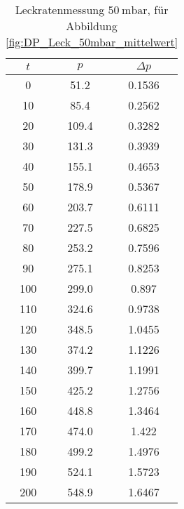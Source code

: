 \begin{table}[H]
    \centering
    \caption{Leckratenmessung $\SI{50}{\milli\bar}$, für Abbildung \ref{fig:DP_Leck_50mbar_mittelwert}}
    \label{tab:}
    \begin{tabular}{c c c}
        \toprule
        {$t$} & {$p$} & {$\Delta p$} \\
        \midrule
        0 & 51.2 & 0.1536  \\
        10 & 85.4 & 0.2562 \\
        20 & 109.4 & 0.3282\\
        30 & 131.3 & 0.3939\\
        40 & 155.1 & 0.4653\\
        50 & 178.9 & 0.5367\\
        60 & 203.7 & 0.6111\\
        70 & 227.5 & 0.6825\\
        80 & 253.2 & 0.7596\\
        90 & 275.1 & 0.8253\\
        100 & 299.0 & 0.897\\
        110 & 324.6 & 0.9738\\
        120 & 348.5 & 1.0455\\
        130 & 374.2 & 1.1226\\
        140 & 399.7 & 1.1991\\
        150 & 425.2 & 1.2756\\
        160 & 448.8 & 1.3464\\
        170 & 474.0 & 1.422\\
        180 & 499.2 & 1.4976\\
        190 & 524.1 & 1.5723\\
        200 & 548.9 & 1.6467\\
        \bottomrule
    \end{tabular}
\end{table}

